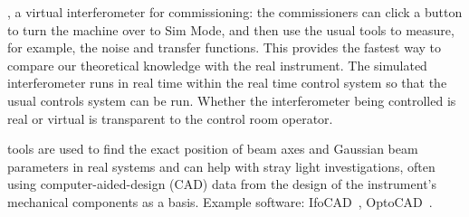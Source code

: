 , a virtual interferometer for commissioning: the commissioners can click a button to turn the machine over to Sim Mode, and then use the usual tools to measure, for example, the noise and transfer functions. This provides the fastest way to compare our theoretical knowledge with the real instrument.
The simulated interferometer runs in real time within the real time control system so that the usual controls system can be run. Whether the interferometer being controlled is real or virtual is transparent to the control room operator.

 tools are used to find the exact position of beam axes and Gaussian beam parameters in real systems and can help with stray light investigations, often using computer-aided-design (CAD) data from the design of the instrument's mechanical components as a basis. Example software: IfoCAD~\cite{IfoCAD, kochkina}, OptoCAD~\cite{OptoCAD}.

